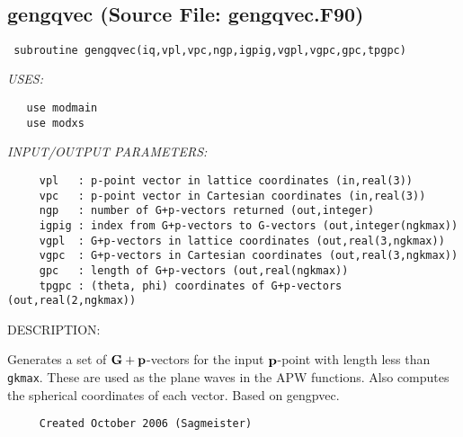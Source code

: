 \documentclass[11pt]{article}
\begin{document}
\mbox{}\hrulefill\ 
 
\subsection{gengqvec (Source File: gengqvec.F90)}


\begin{verbatim} subroutine gengqvec(iq,vpl,vpc,ngp,igpig,vgpl,vgpc,gpc,tpgpc)\end{verbatim}{\em USES:}
\begin{verbatim}   use modmain
   use modxs\end{verbatim}{\em INPUT/OUTPUT PARAMETERS:}
\begin{verbatim}     vpl   : p-point vector in lattice coordinates (in,real(3))
     vpc   : p-point vector in Cartesian coordinates (in,real(3))
     ngp   : number of G+p-vectors returned (out,integer)
     igpig : index from G+p-vectors to G-vectors (out,integer(ngkmax))
     vgpl  : G+p-vectors in lattice coordinates (out,real(3,ngkmax))
     vgpc  : G+p-vectors in Cartesian coordinates (out,real(3,ngkmax))
     gpc   : length of G+p-vectors (out,real(ngkmax))
     tpgpc : (theta, phi) coordinates of G+p-vectors (out,real(2,ngkmax))\end{verbatim}
{\sf DESCRIPTION:\\ }


     Generates a set of ${\bf G+p}$-vectors for the input ${\bf p}$-point with
     length less than {\tt gkmax}. These are used as the plane waves in the APW
     functions. Also computes the spherical coordinates of each vector.
     Based on gengpvec.
  
\begin{verbatim}     Created October 2006 (Sagmeister)\end{verbatim}








 
 
\mbox{}\hrulefill\ 
 
\end{document}
